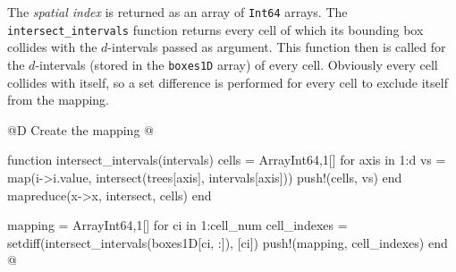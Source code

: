 The \textit{spatial index} is returned as an array of \texttt{Int64} arrays.
The \texttt{intersect\_intervals} function returns every cell of which its bounding box collides with 
the $d$-intervals passed as argument. This function then is called for the $d$-intervals (stored in the \texttt{boxes1D} array) of every cell.
Obviously every cell collides with itself, so a set difference is performed for every cell to exclude itself from the mapping.

@D Create the mapping
@{function intersect_intervals(intervals)
    cells = Array{Int64,1}[]
    for axis in 1:d
        vs = map(i->i.value, intersect(trees[axis], intervals[axis]))
        push!(cells, vs)
    end
    mapreduce(x->x, intersect, cells)
end

mapping = Array{Int64,1}[]
for ci in 1:cell_num
    cell_indexes = setdiff(intersect_intervals(boxes1D[ci, :]), [ci])
    push!(mapping, cell_indexes)
end
@}